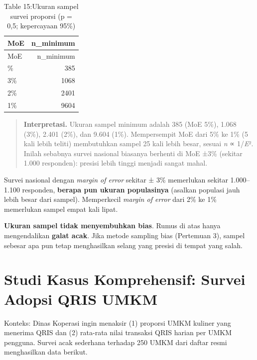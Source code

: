 \documentclass[
  indonesian,
  letterpaper,
]{book}
\begin{document}
\begin{longtable}[]{@{}lr@{}}
\caption{Table 15:Ukuran sampel survei proporsi (p = 0,5; kepercayaan
95\%)}\tabularnewline
\toprule\noalign{}
MoE & n\_minimum \\
\midrule\noalign{}
\endfirsthead
\toprule\noalign{}
MoE & n\_minimum \\
\midrule\noalign{}
\endhead
\bottomrule\noalign{}
\endlastfoot
5\% & 385 \\
3\% & 1068 \\
2\% & 2401 \\
1\% & 9604 \\
\end{longtable}

\begin{quote}
\textbf{Interpretasi.} Ukuran sampel minimum adalah 385 (MoE 5\%), 1.068
(3\%), 2.401 (2\%), dan 9.604 (1\%). Mempersempit MoE dari 5\% ke 1\% (5
kali lebih teliti) membutuhkan sampel 25 kali lebih besar, sesuai
\emph{n} ∝ 1/\emph{E}². Inilah sebabnya survei nasional biasanya
berhenti di MoE ±3\% (sekitar 1.000 responden): presisi lebih tinggi
menjadi sangat mahal.
\end{quote}

Survei nasional dengan \emph{margin of error} sekitar ± 3\% memerlukan
sekitar 1.000--1.100 responden, \textbf{berapa pun ukuran populasinya}
(asalkan populasi jauh lebih besar dari sampel). Memperkecil
\emph{margin of error} dari 2\% ke 1\% memerlukan sampel empat kali
lipat.

\textbf{Ukuran sampel tidak menyembuhkan bias}. Rumus di atas hanya
mengendalikan \textbf{galat acak}. Jika metode sampling bias (Pertemuan
3), sampel sebesar apa pun tetap menghasilkan selang yang presisi di
tempat yang salah.

\section{Studi Kasus Komprehensif: Survei Adopsi QRIS
UMKM}\label{studi-kasus-komprehensif-survei-adopsi-qris-umkm}

Konteks: Dinas Koperasi ingin menaksir (1) proporsi UMKM kuliner yang
menerima QRIS dan (2) rata-rata nilai transaksi QRIS harian per UMKM
pengguna. Survei acak sederhana terhadap 250 UMKM dari daftar resmi
menghasilkan data berikut.
\end{document}
